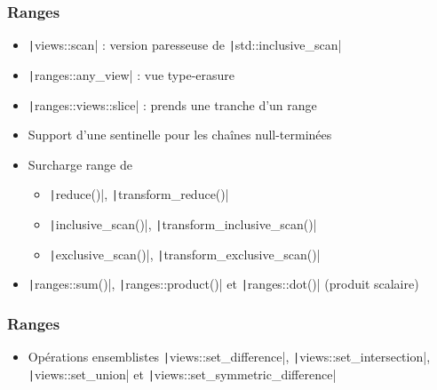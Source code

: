 \documentclass[C++.tex]{subfiles}
\begin{document}
\begin{frame}[fragile]
	\frametitle{Ranges}
	\begin{itemize}
		\item \texttt|views::scan| : version paresseuse de \texttt|std::inclusive_scan|
		\item \texttt|ranges::any_view| : vue type-erasure
		\item \texttt|ranges::views::slice| : prends une tranche d'un range
		\item Support d'une sentinelle pour les chaînes null-terminées
		\item Surcharge range de
		\begin{itemize}
			\item \texttt|reduce()|, \texttt|transform_reduce()|
			\item \texttt|inclusive_scan()|, \texttt|transform_inclusive_scan()|
			\item \texttt|exclusive_scan()|, \texttt|transform_exclusive_scan()|
		\end{itemize}
		\item \texttt|ranges::sum()|, \texttt|ranges::product()| et \texttt|ranges::dot()| (produit scalaire)

	\end{itemize}

\end{frame}

\begin{frame}[fragile]
	\frametitle{Ranges}
	\begin{itemize}
		\item Opérations ensemblistes \texttt|views::set_difference|, \texttt|views::set_intersection|, \texttt|views::set_union| et \texttt|views::set_symmetric_difference|
	\end{itemize}

\end{frame}
\end{document}
